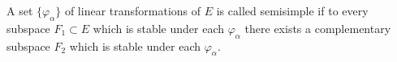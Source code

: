A set $\{\varphi_\alpha\}$ of linear transformations of $E$ is called semisimple if to every subspace $F_1 \subset E$ which is stable under each $\varphi_\alpha$ there exists a complementary subspace $F_2$ which is stable under each $\varphi_\alpha$.
